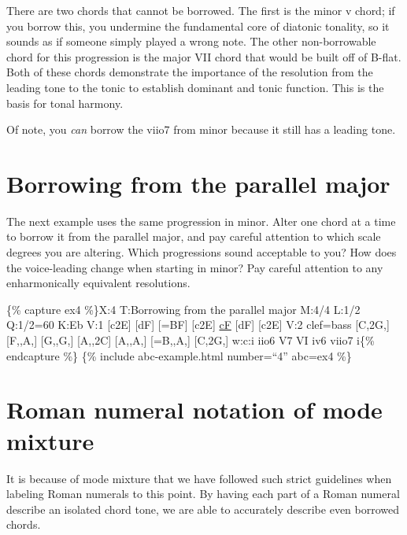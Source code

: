 \documentclass{book}
\begin{document}
There are two chords that cannot be borrowed. The first is the minor v chord;
if you borrow this, you undermine the fundamental core of diatonic tonality,
so it sounds as if someone simply played a wrong note. The other
non-borrowable chord for this progression is the major VII chord that would be
built off of B-flat. Both of these chords demonstrate the importance of the
resolution from the leading tone to the tonic to establish dominant and tonic
function. This is the basis for tonal harmony.

Of note, you \emph{can} borrow the viio7 from minor because it still has a
leading tone.

\hypertarget{borrowing-from-the-parallel-major}{%
\section{Borrowing from the parallel
major}\label{borrowing-from-the-parallel-major}}

The next example uses the same progression in minor. Alter one chord at a time
to borrow it from the parallel major, and pay careful attention to which scale
degrees you are altering. Which progressions sound acceptable to you? How does
the voice-leading change when starting in minor? Pay careful attention to any
enharmonically equivalent resolutions.

\{\% capture ex4 \%\}X:4 T:Borrowing from the parallel major M:4/4 L:1/2
Q:1/2=60 K:Eb V:1 {[}c2E{]}\textbar{} {[}dF{]} {[}=BF{]}\textbar{}
{[}c2E{]}\textbar{} \href{cantusFirmus.html}{cF} {[}dF{]}\textbar{}
{[}c2E{]}\textbar{]} V:2 clef=bass {[}C,2G,{]}\textbar{} {[}F,,A,{]}
{[}G,,G,{]}\textbar{} {[}A,,2C{]}\textbar{} {[}A,,A,{]} {[}=B,,A,{]}\textbar{}
{[}C,2G,{]}\textbar{]} w:c:i iio6 V7 VI iv6 viio7 i\{\% endcapture \%\} \{\%
include abc-example.html number=``4'' abc=ex4 \%\}

\hypertarget{roman-numeral-notation-of-mode-mixture}{%
\section{Roman numeral notation of mode
mixture}\label{roman-numeral-notation-of-mode-mixture}}

It is because of mode mixture that we have followed such strict guidelines
when labeling Roman numerals to this point. By having each part of a Roman
numeral describe an isolated chord tone, we are able to accurately describe
even borrowed chords.
\end{document}
